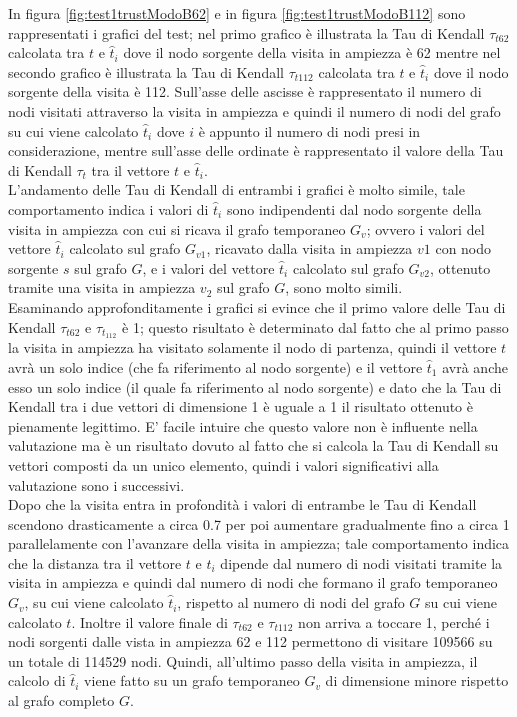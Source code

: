 In figura \ref{fig:test1trustModoB62}  e in figura \ref{fig:test1trustModoB112} sono rappresentati i grafici del test;  nel primo grafico è illustrata la Tau di Kendall \(\tau_{t62}\) calcolata tra \(t\) e \(\hat{t}_i\) dove il nodo sorgente della visita in ampiezza è 62 mentre nel secondo grafico è illustrata la Tau di Kendall \(\tau_{t112}\) calcolata tra \(t\) e \(\hat{t}_i\) dove il nodo sorgente della visita è 112. Sull'asse delle ascisse è rappresentato il numero di nodi  visitati attraverso la visita in ampiezza e quindi il numero di nodi del grafo su cui viene calcolato \(\hat{t}_i\) dove \(i\) è appunto il numero di nodi presi in considerazione, mentre sull'asse delle ordinate è rappresentato il valore della Tau di Kendall \(\tau_t\) tra il vettore \(t\) e \(\hat{t}_i\).\\
L'andamento delle Tau di Kendall di entrambi i grafici è molto simile, tale comportamento indica i valori di \(\hat{t}_i\) sono indipendenti dal nodo sorgente della visita in ampiezza  con cui si ricava il grafo temporaneo \(G_v\); ovvero i valori del vettore \(\hat{t}_i\) calcolato sul grafo \(G_{v1}\), ricavato dalla visita in ampiezza \(v1\) con nodo sorgente \(s\) sul grafo \(G\), e i valori del vettore \(\hat{t}_i\) calcolato sul grafo \(G_{v2}\), ottenuto tramite una visita in ampiezza \(v_2\) sul grafo \(G\), sono molto simili.\\
Esaminando approfonditamente i grafici si evince che il primo  valore delle Tau di Kendall \(\tau_{t62}\) e \(\tau_{t_112}\) è 1; questo risultato è determinato dal fatto che al primo passo la visita in ampiezza ha visitato solamente il nodo di partenza, quindi  il vettore \(t\) avrà un solo indice (che fa riferimento al nodo sorgente) e il vettore \(\hat{t}_1\) avrà anche esso un solo indice (il quale fa riferimento al nodo sorgente) e dato che  la Tau di Kendall tra i due vettori di dimensione 1 è uguale a 1 il risultato ottenuto è pienamente legittimo. E' facile intuire che questo valore non è influente nella valutazione ma è un risultato dovuto al fatto che si calcola la Tau di Kendall su vettori composti da un unico elemento, quindi i valori significativi alla valutazione sono i successivi.\\
Dopo che la visita entra in profondità i valori di entrambe le Tau di Kendall  scendono drasticamente a circa 0.7 per poi aumentare gradualmente fino a circa 1 parallelamente con l'avanzare della visita in ampiezza; tale comportamento indica che la distanza tra il vettore \(t\) e \(\hat{t}_i\) dipende dal numero di nodi visitati tramite la visita in ampiezza e quindi dal numero di nodi che formano il grafo temporaneo \(G_v\), su cui viene calcolato \(\hat{t}_i\), rispetto al numero di nodi del grafo \(G\) su cui viene calcolato \(t\). Inoltre il valore finale di \(\tau_{t62}\) e \(\tau_{t112}\) non arriva a toccare 1, perché i nodi sorgenti dalle vista in ampiezza 62 e 112 permettono di visitare 109566 su un totale di 114529 nodi. Quindi, all'ultimo passo della visita in ampiezza,  il calcolo di \(\hat{t}_i\) viene fatto su un grafo temporaneo \(G_v\) di dimensione minore rispetto al grafo completo \(G\).

